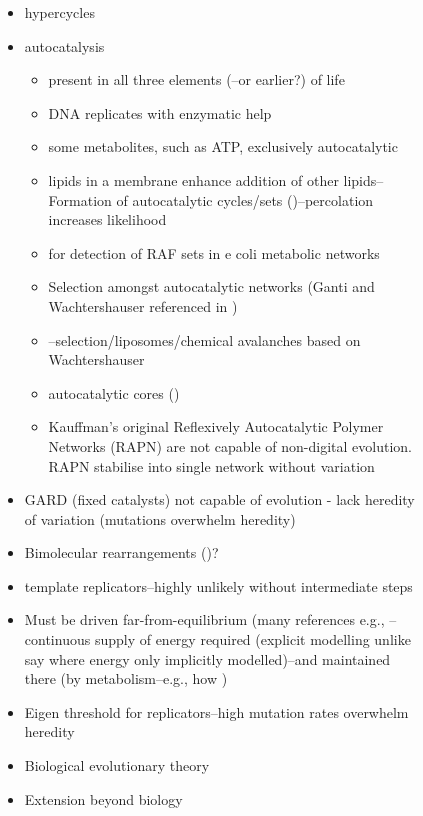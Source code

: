 \begin{figure}
\begin{framed}
\begin{itemize}
\item
hypercycles \autocite{Eigen1971}
\item
autocatalysis
\begin{itemize}
	\item
	present in all three elements (\autocite{Ganti:2003hl}--or
	earlier?) of life
	\item
	DNA replicates with enzymatic help
	\item
	some metabolites, such as ATP, exclusively autocatalytic
	\item
	lipids in a membrane enhance addition of other lipids--Formation of
	autocatalytic cycles/sets (\autocite{Hordijk2004})--percolation increases
	likelihood
	\item
	\autocite{Sousa2015} for detection of RAF sets in e coli metabolic
	networks
	\item
	Selection amongst autocatalytic networks (Ganti and Wachtershauser referenced in \autocite{Fernando:2005ly})
	\item
	\autocite{Fernando:2007pf}--selection/liposomes/chemical avalanches
	based on Wachtershauser
	\item
	autocatalytic cores (\autocite{Vasas2012})
	\item
	Kauffman's original Reflexively Autocatalytic Polymer Networks
	(RAPN) \autocite{Kauffman1986,Farmer1986} are not capable of
	non-digital evolution. RAPN stabilise into single network without
	variation
\end{itemize}
\item
GARD (fixed catalysts) \autocite{Segre1998} not capable of evolution -
lack heredity of variation (mutations overwhelm heredity) \autocite{Vasas2010}
\item
Bimolecular rearrangements (\autocite{Fernando:2008xy,Fernando:2007pf})?
\item
template replicators--highly unlikely without intermediate steps
\item
Must be driven far-from-equilibrium (many references e.g.,
\autocite{Pascal2015}--continuous supply of energy required (explicit
modelling unlike say \autocite{Fontana1994} where energy only
implicitly modelled)--and maintained there (by metabolism--e.g., how
)
\item
Eigen threshold for replicators--high mutation rates overwhelm
heredity
\item
Biological evolutionary theory
\item
Extension beyond biology


\end{itemize}
\end{framed}
\end{figure}
